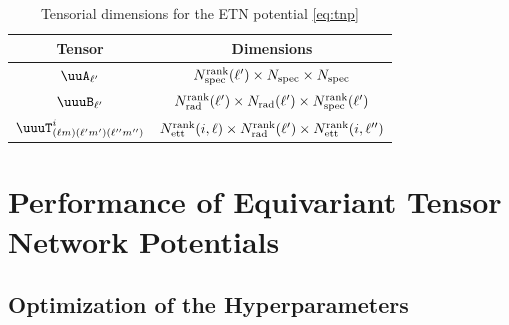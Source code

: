 \begin{table}[hbt]
    \centering
    \begin{tabular}{|c|c|}
        \hline
        Tensor & Dimensions \\ \hline\hline
        $\uuA_{\ell'}$ & $N_{\rm spec}^{\rm rank}(\ell') \times N_{\rm spec} \times N_{\rm spec}$ \\ \hline
        $\uuuB_{\ell'}$ & $N_{\rm rad}^{\rm rank}(\ell') \times N_{\rm rad}(\ell') \times N_{\rm spec}^{\rm rank}(\ell')$ \\ \hline
        $\uuuT^i_{(\ell m)(\ell'm')(\ell''m'')}$ & $N_{\rm ett}^{\rm rank}(i,\ell) \times N_{\rm rad}^{\rm rank}(\ell') \times N_{\rm ett}^{\rm rank}(i,\ell'')$ \\ \hline
    \end{tabular}
    \caption{Tensorial dimensions for the ETN potential \eqref{eq:tnp}}
    \label{tab:tensor-dimensions-TNP}
\end{table}

\section{Performance of Equivariant Tensor Network Potentials}
\label{sec:ETNP-performance}

\subsection{Optimization of the Hyperparameters}

